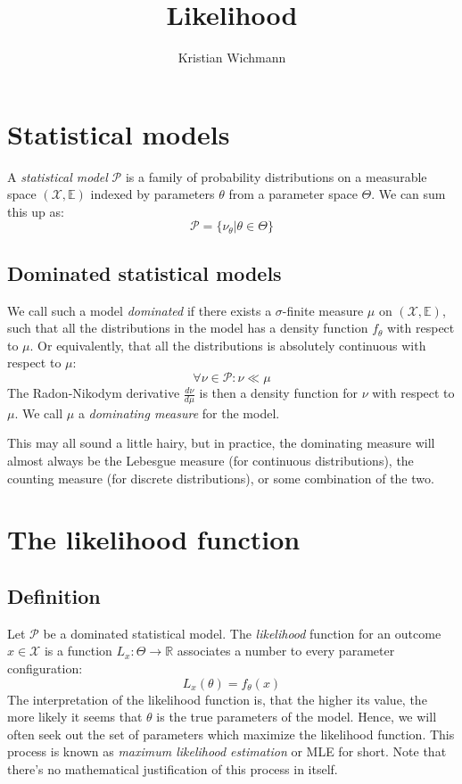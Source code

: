 \documentclass[12pt, a4paper]{article}
\title{Likelihood}
\author{Kristian Wichmann}
\numberwithin{equation}{section}
\begin{document}
\maketitle

\section{Statistical models}
A \textit{statistical model} $\mathcal{P}$ is a family of probability distributions on a measurable space $(\mathcal{X},\mathbb{E})$ indexed by parameters $\theta$ from a parameter space $\Theta$. We can sum this up as:
\begin{equation}
\mathcal{P}=\{\nu_\theta|\theta\in\Theta\}
\end{equation}

\subsection{Dominated statistical models}
We call such a model \textit{dominated} if there exists a $\sigma$-finite measure $\mu$ on $(\mathcal{X},\mathbb{E})$, such that all the distributions in the model has a density function $f_\theta$ with respect to $\mu$. Or equivalently, that all the distributions is absolutely continuous with respect to $\mu$:
\begin{equation}
\forall\nu\in\mathcal{P}: \nu\ll\mu
\end{equation}
The Radon-Nikodym derivative $\frac{d\nu}{d\mu}$ is then a density function for $\nu$ with respect to $\mu$. We call $\mu$ a \textit{dominating measure} for the model.

This may all sound a little hairy, but in practice, the dominating measure will almost always be the Lebesgue measure (for continuous distributions), the counting measure (for discrete distributions), or some combination of the two.

\section{The likelihood function}

\subsection{Definition}
Let $\mathcal{P}$ be a dominated statistical model. The \textit{likelihood} function for an outcome $x\in\mathcal{X}$ is a function $L_x:\Theta\rightarrow\mathbb{R}$ associates a number to every parameter configuration:
\begin{equation}
L_x(\theta)=f_\theta(x)
\end{equation}
The interpretation of the likelihood function is, that the higher its value, the more likely it seems that $\theta$ is the true parameters of the model. Hence, we will often seek out the set of parameters which maximize the likelihood function. This process is known as \textit{maximum likelihood estimation} or MLE for short. Note that there's no mathematical justification of this process in itself.
\end{document}
